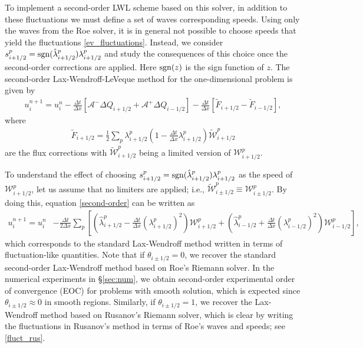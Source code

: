 \documentclass[preprint, 11pt]{article}
\newcommand{\W}{{\mathcal W}}
\newcommand{\A}{{\mathcal A}}
\newcommand{\sgn}{{\rm sgn}}
\begin{document}
To implement a second-order LWL scheme based on this solver, in addition to
these fluctuations we must define a set of waves corresponding speeds.
Using only the waves from the Roe solver, it is in general not possible
to choose speeds that yield the fluctuations \eqref{ev_fluctuations}.
Instead, we consider
$s_{i+1/2}^p=\sgn(\hat\lambda_{i+1/2}^p)\lambda_{i+1/2}^p$
 and study the consequences of this choice once the second-order corrections are applied.
Here $\sgn(z)$ is the sign function of $z$.
The second-order Lax-Wendroff-LeVeque method for the one-dimensional problem is given by
\begin{align}\label{second-order}
  u_i^{n+1}=u_i^n
  -\frac{\Delta t}{\Delta x}\left[\A^-\Delta Q_{i+1/2}+\A^+\Delta Q_{i-1/2}\right]
  -\frac{\Delta t}{\Delta x}\left[\tilde F_{i+1/2}-\tilde F_{i-1/2}\right],
\end{align}
where
\begin{align*}
  \tilde F_{i+1/2} = \frac{1}{2}\sum_p\lambda_{i+1/2}^p
  \left(1-\frac{\Delta t}{\Delta x}\lambda_{i+1/2}^p\right)\tilde\W_{i+1/2}^p
\end{align*}
are the flux corrections with $\tilde\W_{i+1/2}^p$ being a limited version of $\W_{i+1/2}^p$.

To understand the effect of choosing $s_{i+1/2}^p=\sgn(\hat\lambda_{i+1/2}^p)\lambda_{i+1/2}^p$
as the speed of $\W_{i+1/2}^p$,
let us assume that no limiters are applied; i.e., $\tilde\W_{i\pm 1/2}^p\equiv \W_{i\pm 1/2}^p$.
By doing this, equation \eqref{second-order} can be written as
\begin{align*}
  u_i^{n+1}=u_i^n
  &-\frac{\Delta t}{2 \Delta x}
  \sum_p
  \left[\left(\hat\lambda_{i+1/2}^p -\frac{\Delta t}{\Delta x}(\lambda_{i+1/2}^p)^2 \right)\W_{i+1/2}^p
  +
  \left(\hat\lambda_{i-1/2}^p +\frac{\Delta t}{\Delta x}(\lambda_{i-1/2}^p)^2 \right)\W_{i-1/2}^p\right],
\end{align*}
which corresponds to the standard Lax-Wendroff method written in terms of fluctuation-like quantities.
Note that if $\theta_{i\pm 1/2}=0$, we recover the standard second-order Lax-Wendroff method based on
Roe's Riemann solver.
In the numerical experiments in \S\ref{sec:num}, we obtain second-order experimental
order of convergence (EOC) for problems with smooth solution, which is expected since
$\theta_{i\pm 1/2}\approx 0$ in smooth regions.
Similarly, if $\theta_{i\pm 1/2}=1$, we recover the Lax-Wendroff method based on Rusanov's Riemann solver,
which is clear by writing the fluctuations in Rusanov's method in terms of Roe's waves and speeds;
see \eqref{fluct_rus}.
\end{document}
